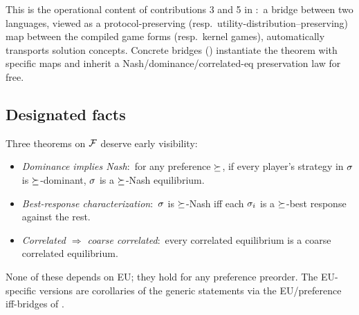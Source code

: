 \noindent
This is the operational content of contributions 3 and 5 in
:\ a bridge between two languages, viewed
as a protocol-preserving (resp.\ utility-distribution--preserving) map between the
compiled game forms (resp.\ kernel games), automatically
transports solution concepts.  Concrete bridges
() instantiate the theorem with
specific maps and inherit a Nash/dominance/correlated-eq
preservation law for free.


\subsection{Designated facts}
\label{sec:semantic-core:designated}

Three theorems on $\mathcal{F}$ deserve early visibility:
\begin{itemize}\itemsep2pt
\item \emph{Dominance implies Nash}:\ for any preference
$\succeq$, if every player's strategy in $\sigma$ is
$\succeq$-dominant, $\sigma$ is a $\succeq$-Nash equilibrium.

\item \emph{Best-response characterization}:\ $\sigma$ is
$\succeq$-Nash iff each $\sigma_i$ is a $\succeq$-best response
against the rest.

\item \emph{Correlated $\Rightarrow$ coarse correlated}:\ every
correlated equilibrium is a coarse correlated equilibrium.
\end{itemize}
None of these depends on EU; they hold for any preference
preorder.  The EU-specific versions are corollaries of the
generic statements via the EU/preference iff-bridges of
.

